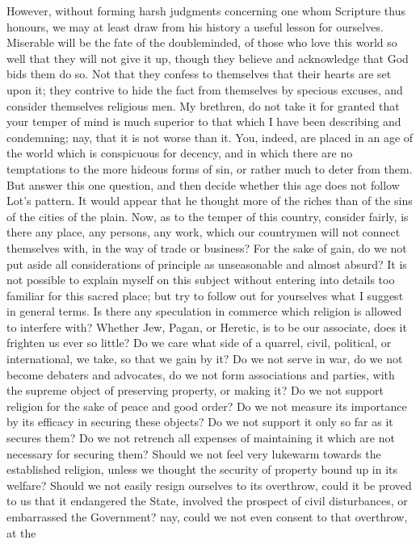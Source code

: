 However, without forming harsh judgments concerning one whom
Scripture thus honours, we may at least draw from his history a useful
lesson for ourselves. Miserable will be the fate of the doubleminded,
of those who love this world so well that they will not give it up,
though they believe and acknowledge that God bids them do so. Not that
they confess to themselves that their hearts are set upon it; they
contrive to hide the fact from themselves by specious excuses, and
consider themselves religious men. My brethren, do not take it for
granted that your temper of mind is much superior to that which I have
been describing and condemning; nay, that it is not worse than it.
You, indeed, are placed in an age of the world which is conspicuous
for decency, and in which there are no temptations to the more hideous
forms of sin, or rather much to deter from them. But answer this one
question, and then decide whether this age does not follow Lot's
pattern. It would appear that he thought more of the riches than of
the sins of the cities of the plain. Now, as to the temper of this
country, consider fairly, is there any place, any persons, any work,
which our countrymen will not connect themselves with, in the way of
trade or business? For the sake of gain, do we not put aside all
considerations of principle as unseasonable and almost absurd? It is
not possible to explain myself on this subject without entering into
details too familiar for this sacred place; but try to follow out for
yourselves what I suggest in general terms. Is there any speculation
in commerce which religion is allowed to interfere with? Whether Jew,
Pagan, or Heretic, is to be our associate, does it frighten us ever so
little? Do we care what side of a quarrel, civil, political, or
international, we take, so that we gain by it? Do we not serve in war,
do we not become debaters and advocates, do we not form associations
and parties, with the supreme object of preserving property, or making
it? Do we not support religion for the sake of peace and good order?
Do we not measure its importance by its efficacy in securing these
objects? Do we not support it only so far as it secures them? Do we
not retrench all expenses of maintaining it which are not necessary
for securing them? Should we not feel very lukewarm towards the
established religion, unless we thought the security of property bound
up in its welfare? Should we not easily resign ourselves to its
overthrow, could it be proved to us that it endangered the State,
involved the prospect of civil disturbances, or embarrassed the
Government? nay, could we not even consent to that overthrow, at the
